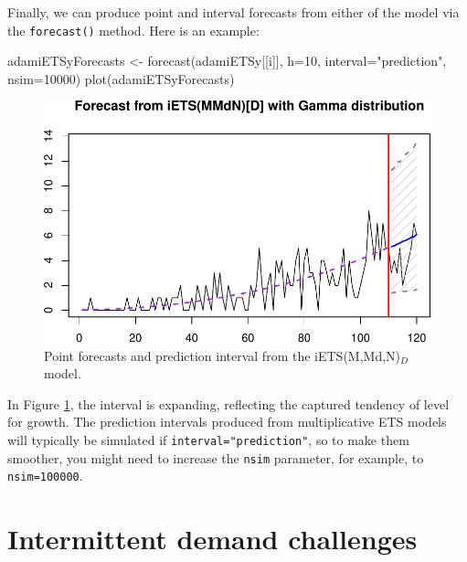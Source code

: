 \documentclass[
]{book}
\newenvironment{Shaded}{\begin{snugshade}}{\end{snugshade}}
\newcommand{\AttributeTok}[1]{\textcolor[rgb]{0.77,0.63,0.00}{#1}}
\newcommand{\DecValTok}[1]{\textcolor[rgb]{0.00,0.00,0.81}{#1}}
\newcommand{\FunctionTok}[1]{\textcolor[rgb]{0.00,0.00,0.00}{#1}}
\newcommand{\NormalTok}[1]{#1}
\newcommand{\OtherTok}[1]{\textcolor[rgb]{0.56,0.35,0.01}{#1}}
\newcommand{\StringTok}[1]{\textcolor[rgb]{0.31,0.60,0.02}{#1}}
\theoremstyle{definition}
\theoremstyle{definition}
\theoremstyle{definition}
\theoremstyle{definition}
\theoremstyle{remark}
\begin{document}
Finally, we can produce point and interval forecasts from either of the model via the \texttt{forecast()} method. Here is an example:

\begin{Shaded}
\begin{Highlighting}[]
\NormalTok{adamiETSyForecasts }\OtherTok{\textless{}{-}} \FunctionTok{forecast}\NormalTok{(adamiETSy[[i]], }\AttributeTok{h=}\DecValTok{10}\NormalTok{,}
                               \AttributeTok{interval=}\StringTok{"prediction"}\NormalTok{, }\AttributeTok{nsim=}\DecValTok{10000}\NormalTok{)}
\FunctionTok{plot}\NormalTok{(adamiETSyForecasts)}
\end{Highlighting}
\end{Shaded}

\begin{figure}
\centering
\includegraphics{Svetunkov--2022----ADAM_files/figure-latex/adamiETSyForecasts-1.pdf}
\caption{\label{fig:adamiETSyForecasts}Point forecasts and prediction interval from the iETS(M,Md,N)\(_D\) model.}
\end{figure}

In Figure \ref{fig:adamiETSyForecasts}, the interval is expanding, reflecting the captured tendency of level for growth. The prediction intervals produced from multiplicative ETS models will typically be simulated if \texttt{interval="prediction"}, so to make them smoother, you might need to increase the \texttt{nsim} parameter, for example, to \texttt{nsim=100000}.

\hypertarget{intermittent-demand-challenges}{%
\section{Intermittent demand challenges}\label{intermittent-demand-challenges}}
\end{document}
